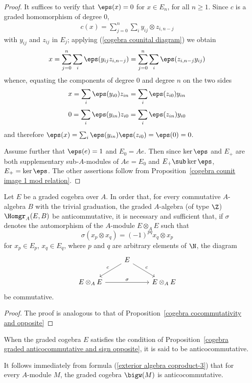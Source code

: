 \begin{proof}
It suffices to verify that $\eps(x)=0$ for $x\in E_n$, for all $n\geq 1$. Since $c$ is a graded homomorphism of degree $0$,
\begin{align}
c(x)=\sum_{j=0}^{n}\sum_iy_{ij}\otimes z_{i,n-j}
\end{align}
with $y_{ij}$ and $z_{ij}$ in $E_j$; applying (\ref{cogebra counital diagram}) we obtain
\[x=\sum_{j=0}^{n}\sum_i\eps(y_{ij}z_{i,n-j})=\sum_{j=0}^{n}\sum_i\eps(z_{i,n-j}y_{ij})\]
whence, equating the components of degree $0$ and degree $n$ on the two sides
\[x=\sum_i\eps(y_{i0})z_{in}=\sum_i\eps(z_{i0})y_{in}\]
\[0=\sum_i\eps(y_{in})z_{i0}=\sum_i\eps(z_{in})y_{i0}\]
and therefore $\eps(x)=\sum_i\eps(y_{in})\eps(z_{i0})=\eps(0)=0$.\par
Assume further that $\eps(e)=1$ and $E_0=Ae$. Then since $\ker\eps$ and $E_+$ are both supplementary sub-$A$-modules of $Ae=E_0$ and $E_+\sub\ker\eps$, $E_+=\ker\eps$. The other assertions follow from Proposition~\ref{cogebra counit image 1 mod relation}.
\end{proof}
\begin{proposition}\label{cogebra graded anticocommutative and sign opposite}
Let $E$ be a graded cogebra over $A$. In order that, for every commutative $A$-algebra $B$ with the trivial graduation, the graded $A$-algebra (of type $\Z$) $\Homgr_A(E,B)$ be anticommutative, it is necessary and sufficient that, if $\sigma$ denotes the automorphism of the $A$-module $E\otimes_AE$ such that
\[\sigma(x_p\otimes x_q)=(-1)^{pq}x_q\otimes x_p\]
for $x_p\in E_p$, $x_q\in E_q$, where $p$ and $q$ are arbitrary elements of $\N$, the diagram
\[\begin{tikzcd}
&E\ar[ld,swap,"c"]\ar[rd,"c"]&\\
E\otimes_AE\ar[rr,"\sigma"]&&E\otimes_AE
\end{tikzcd}\]
be commutative.
\end{proposition}
\begin{proof}
The proof is analogous to that of Proposition~\ref{cogebra cocommutativity and opposite}
\end{proof}
When the graded cogebra $E$ satisfies the condition of Proposition~\ref{cogebra graded anticocommutative and sign opposite}, it is said to be anticocommutative.
\begin{example}
It follows immediately from formula (\ref{exterior algebra coproduct-3}) that for every $A$-module $M$, the graded cogebra $\bigw(M)$ is anticocommutative.
\end{example}
